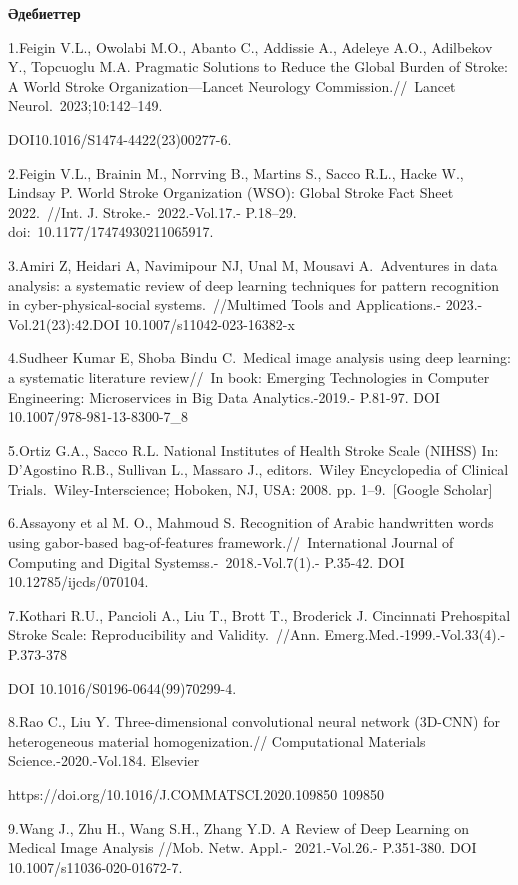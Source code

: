 \textbf{Әдебиеттер}

1.Feigin V.L., Owolabi M.O., Abanto C., Addissie A., Adeleye A.O.,
Adilbekov Y., Topcuoglu M.A. Pragmatic Solutions to Reduce the Global
Burden of Stroke: A World Stroke Organization---Lancet Neurology
Commission.//~Lancet Neurol.~2023;10:142--149.

DOI10.1016/S1474-4422(23)00277-6.~

2.Feigin V.L., Brainin M., Norrving B., Martins S., Sacco R.L., Hacke
W., Lindsay P. World Stroke Organization (WSO): Global Stroke Fact Sheet
2022.~//Int. J. Stroke.-~2022.-Vol.17.- P.18--29.
doi:~10.1177/17474930211065917.~

3.Amiri Z, Heidari A, Navimipour NJ, Unal M, Mousavi A.~Adventures in
data analysis: a systematic review of deep learning techniques for
pattern recognition in cyber-physical-social systems.~//Multimed Tools
and Applications.- 2023.- Vol.21(23):42.DOI 10.1007/s11042-023-16382-x

4.Sudheer Kumar E, Shoba Bindu C.~Medical image analysis using deep
learning: a systematic literature review//~In book: Emerging
Technologies in Computer Engineering: Microservices in Big Data
Analytics.-2019.- P.81-97. DOI 10.1007/978-981-13-8300-7\_8

5.Ortiz G.A., Sacco R.L. National Institutes of Health Stroke Scale
(NIHSS) In: D'Agostino R.B., Sullivan L., Massaro J., editors.~Wiley
Encyclopedia of Clinical Trials.~Wiley-Interscience; Hoboken, NJ, USA:
2008. pp. 1--9.~{[}Google Scholar{]}

6.Assayony et al M. O., Mahmoud S. Recognition of Arabic handwritten
words using gabor-based bag-of-features
framework.//\emph{~}International Journal of Computing and Digital
Systemss.-\emph{~}2018.-Vol.7(1).- P.35-42. DOI 10.12785/ijcds/070104.

7.Kothari R.U., Pancioli A., Liu T., Brott T., Broderick J. Cincinnati
Prehospital Stroke Scale: Reproducibility and Validity.~//Ann.
Emerg.Med.\emph{-}1999.-Vol.33(4).- P.373-378

DOI 10.1016/S0196-0644(99)70299-4.

8.Rao C., Liu Y. Three-dimensional convolutional neural network (3D-CNN)
for heterogeneous material homogenization.// Computational Materials
Science.-2020.-Vol.184. Elsevier

https://doi.org/10.1016/J.COMMATSCI.2020.109850 109850

9.Wang J., Zhu H., Wang S.H., Zhang Y.D. A Review of Deep Learning on
Medical Image Analysis //Mob. Netw. Appl.-\emph{~}2021.-Vol.26.-
P.351-380. DOI 10.1007/s11036-020-01672-7.~


